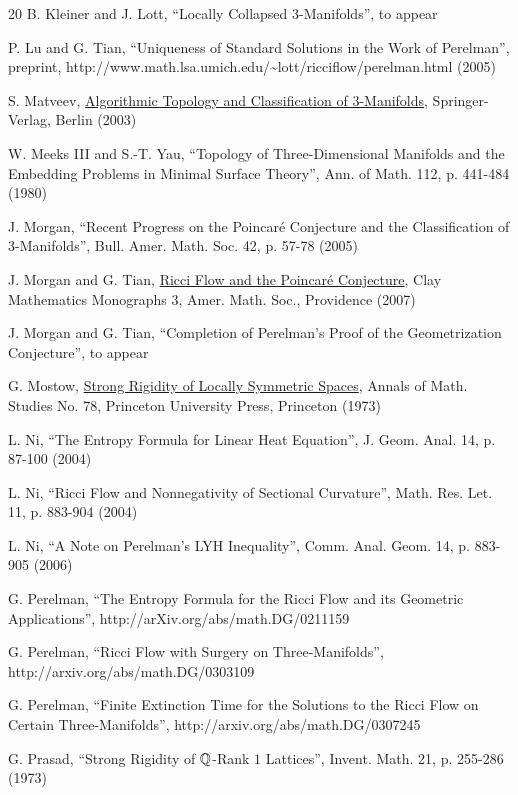 \begin{thebibliography}{20}
 B. Kleiner and J. Lott, ``Locally Collapsed
$3$-Manifolds'', to appear

 P. Lu and G. Tian,
``Uniqueness of Standard Solutions in the Work of Perelman'',
preprint, http://www.math.lsa.umich.edu/\~{}lott/ricciflow/perelman.html  (2005)

S. Matveev,
\underline{Algorithmic Topology and Classification of 3-Manifolds},
Springer-Verlag, Berlin (2003)

W. Meeks III and S.-T. Yau,
``Topology of Three-Dimensional Manifolds and the Embedding Problems in
Minimal Surface Theory'',
Ann. of Math. 112, p. 441-484 (1980)

 J. Morgan,
``Recent Progress on the Poincar\'e Conjecture and the Classification of $3$-Manifolds'',
Bull. Amer. Math. Soc. 42, p. 57-78 (2005)

 J. Morgan and G. Tian,
\underline{Ricci Flow and the Poincar\'e Conjecture},
Clay Mathematics Monographs 3, Amer. Math. Soc., Providence (2007)

 J. Morgan and G. Tian,
``Completion of Perelman's Proof of the Geometrization Conjecture'',
to appear

 G. Mostow,
\underline{Strong Rigidity of Locally Symmetric Spaces},
Annals of Math. Studies No. 78,
Princeton University Press, Princeton (1973)

 L. Ni, ``The Entropy Formula for Linear Heat Equation'',
J. Geom. Anal. 14, p. 87-100 (2004)

 L. Ni, ``Ricci Flow and Nonnegativity of Sectional
Curvature'', Math. Res. Let. 11, p. 883-904 (2004)

 L. Ni, ``A Note on Perelman's LYH Inequality'',
Comm. Anal. Geom. 14, p. 883-905 (2006)

G. Perelman,
``The Entropy Formula for the Ricci Flow and its Geometric
Applications'', http://arXiv.org/abs/math.DG/0211159

G. Perelman,
``Ricci Flow with Surgery on Three-Manifolds'',
http://arxiv.org/abs/math.DG/0303109

G. Perelman,
``Finite Extinction Time for the Solutions to the Ricci Flow
on Certain Three-Manifolds'',
http://arxiv.org/abs/math.DG/0307245


 G. Prasad, ``Strong Rigidity of ${\mathbb Q}$-Rank $1$ Lattices'',
Invent. Math. 21, p. 255-286 (1973)


\end{thebibliography}
